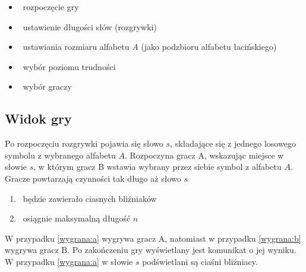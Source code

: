 \documentclass[11pt,a4paper]{article}
\begin{document}
\begin{itemize}
	\item\ rozpoczęcie gry
	\item\ ustawienie długości słów (rozgrywki)
	\item\ ustawiania rozmiaru alfabetu $A$ (jako podzbioru alfabetu łacińskiego)
	\item\ wybór poziomu trudności
	\item\ wybór graczy
\end{itemize}

\subsection{Widok gry}
Po rozpoczęciu rozgrywki pojawia się słowo $s$,
składające się z jednego losowego
symbolu z wybranego alfabetu $A$.
Rozpoczyna gracz A, wskazując miejsce w słowie $s$,
w którym gracz B wstawia wybrany przez
siebie symbol z alfabetu $A$.
Gracze powtarzają czynności tak długo aż słowo $s$
\begin{enumerate}
	\item\ będzie zawierało ciasnych bliźniaków\label{wygrana:a}
	\item\ osiągnie maksymalną długość $n$\label{wygrana:b}
\end{enumerate}

W przypadku \ref{wygrana:a} wygrywa gracz A, natomiast
w przypadku \ref{wygrana:b} wygrywa gracz B.
Po zakończeniu gry wyświetlany jest komunikat o jej wyniku.
W przypadku \ref{wygrana:a} w słowie $s$ podświetlani są
ciaśni bliźniacy.
\end{document}

